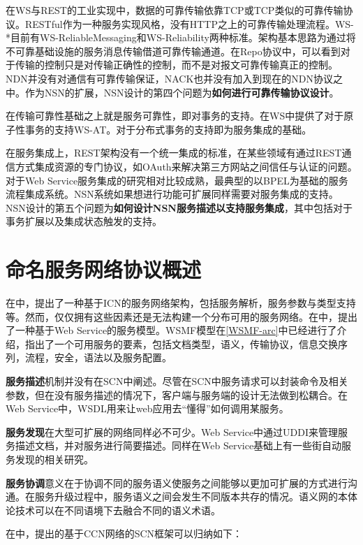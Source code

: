 在WS与REST的工业实现中，数据的可靠传输依靠TCP或TCP类似的可靠传输协议。RESTful作为一种服务实现风格，没有HTTP之上的可靠传输处理流程。WS-*目前有WS-ReliableMessaging\cite{ferris2005web}和WS-Reliability\cite{iwasa2004ws}两种标准。架构基本思路为通过将不可靠基础设施的服务消息传输借道可靠传输通道。在Repo协议中，可以看到对于传输的控制只是对传输正确性的控制，而不是对报文可靠传输真正的控制。NDN并没有对通信有可靠传输保证，NACK也并没有加入到现在的NDN协议之中。作为NSN的扩展，NSN设计的第四个问题为\textbf{如何进行可靠传输协议设计}。

在传输可靠性基础之上就是服务可靠性，即对事务的支持。在WS中提供了对于原子性事务的支持WS-AT。对于分布式事务的支持即为服务集成的基础。

在服务集成上，REST架构没有一个统一集成的标准，在某些领域有通过REST通信方式集成资源的专门协议，如OAuth来解决第三方网站之间信任与认证的问题\cite{hardt2012oauth}。对于Web Service服务集成的研究相对比较成熟，最典型的以BPEL为基础的服务流程集成系统。NSN系统如果想进行功能可扩展同样需要对服务集成的支持。NSN设计的第五个问题为\textbf{如何设计NSN服务描述以支持服务集成}，其中包括对于事务扩展以及集成状态触发的支持。

\section{命名服务网络协议概述}
在\cite{braun2013service}中，提出了一种基于ICN的服务网络架构，包括服务解析，服务参数与类型支持等。然而，仅仅拥有这些因素还是无法构建一个分布可用的服务网络。在\cite{fensel2002web}中，提出了一种基于Web Service的服务模型。WSMF模型在\ref{WSMF-arc}中已经进行了介绍，指出了一个可用服务的要素，包括文档类型，语义，传输协议，信息交换序列，流程，安全，语法以及服务配置。

\textbf{服务描述}机制并没有在SCN中阐述。\cite{braun2013service}尽管在SCN中服务请求可以封装命令及相关参数，但在没有服务描述的情况下，客户端与服务端的设计无法做到松耦合。在Web Service中，WSDL用来让web应用去“懂得”如何调用某服务。

\textbf{服务发现}在大型可扩展的网络同样必不可少。Web Service中通过UDDI来管理服务描述文档，并对服务进行简要描述。同样在Web Service基础上有一些街自动服务发现的相关研究。\cite{klusch2006automated,schmidt2004peer,schlosser2002scalable}

\textbf{服务协调}意义在于协调不同的服务语义使服务之间能够以更加可扩展的方式进行沟通。在服务升级过程中，服务语义之间会发生不同版本共存的情况。语义网的本体论技术可以在不同语境下去融合不同的语义术语。

在\cite{braun2011service, braun2013service}中，提出的基于CCN网络的SCN框架可以归纳如下：

